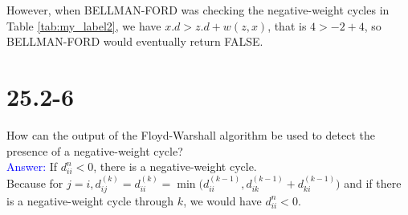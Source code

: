 \documentclass[a4paper]{article}
\begin{document}
    \bigskip
    However, when BELLMAN-FORD was checking the negative-weight cycles in Table \ref{tab:my_label2}, we have $x.d>z.d+w(z,x)$, that is $4>-2+4$, so BELLMAN-FORD would eventually return FALSE.
\section{25.2-6} How can the output of the Floyd-Warshall algorithm be used to detect the presence of a negative-weight cycle?\\
\textcolor{blue}{Answer:}
If $d_{ii}^n<0$, there is a negative-weight cycle. \\
Because for $j=i, d_{ij}^{(k)}=d_{ii}^{(k)}=\min\Big(d_{ii}^{(k-1)}, d_{ik}^{(k-1)}+d_{ki}^{(k-1)}\Big)$ and if there is a negative-weight cycle through $k$, we would have $d_{ii}^n<0$.
\end{document}
